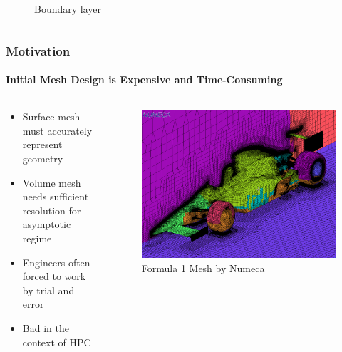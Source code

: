 \documentclass[18pt,xcolor=table]{beamer}
\begin{document}
\begin{frame}[t]
\begin{columns}[c]
\begin{column}{.4\textwidth}
\begin{figure}
Boundary layer
\end{figure}
\end{column}
\end{columns}
\end{frame}  


\begin{frame}[t]
\frametitle{Motivation}
\framesubtitle{Initial Mesh Design is Expensive and Time-Consuming}
\begin{columns}[t]
\begin{column}[c]{0.4\textwidth}
\begin{itemize}
  \item Surface mesh must accurately represent geometry
  \item Volume mesh needs sufficient resolution for asymptotic regime
  \item Engineers often forced to work by trial and error
  \item Bad in the context of HPC
\end{itemize}
\end{column}
\begin{column}[c]{0.6\textwidth}
\vspace{2ex}
\begin{figure}[t]
\centering
\includegraphics[width=1.0\textwidth]{Motivation/NumecaRaceCar.png}
\\\small{Formula 1 Mesh by Numeca}\\
\end{figure}
\end{column}
\end{columns}
\end{frame}
\end{document}
